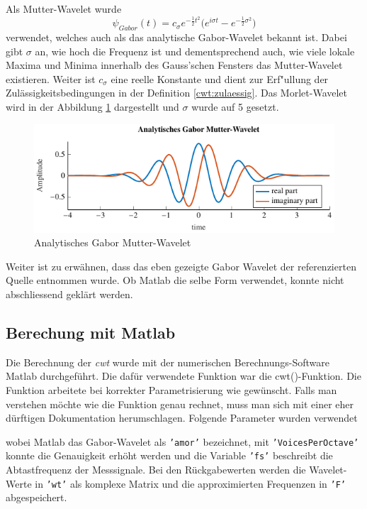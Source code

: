\begin{refsection}
Als Mutter-Wavelet wurde 
\begin{equation}
\psi_{Gabor}(t) =  c_{\sigma} e^{-\frac{1}{2}t^2} \biggl(e^{i \sigma t}- e^{-\frac{1}{2} \sigma^2} \biggr)
\label{eq:morlet}
\end{equation} \cite{online:Morlet}
verwendet, welches auch als das analytische Gabor-Wavelet bekannt ist.
Dabei gibt $\sigma$ an, wie hoch die Frequenz ist und dementsprechend auch, wie viele lokale Maxima und Minima innerhalb des Gauss'schen Fensters das Mutter-Wavelet existieren.
Weiter ist $c_{\sigma}$ eine reelle Konstante und dient zur Erf"ullung der Zulässigkeitsbedingungen in der Definition \ref{cwt:zulaessig}.
Das Morlet-Wavelet wird in der Abbildung \ref{fig:gabor_plot} \space dargestellt und $\sigma$ wurde auf 5 gesetzt.

\begin{figure}
\centering
\includegraphics[width=1\textwidth]{papers/wwt/images/gabor.pdf}
\caption{Analytisches Gabor Mutter-Wavelet}
\label{fig:gabor_plot}
\end{figure}

Weiter ist zu erwähnen, dass das eben gezeigte Gabor Wavelet der referenzierten Quelle entnommen wurde. Ob Matlab die selbe Form verwendet, konnte nicht abschliessend geklärt werden.

\subsection{Berechung mit Matlab}
Die Berechnung der \textit{cwt} wurde mit der numerischen Berechnungs-Software Matlab durchgeführt.
Die dafür verwendete Funktion war die cwt()-Funktion.
Die Funktion arbeitete bei korrekter Parametrisierung wie gewünscht.
Falls man verstehen möchte wie die Funktion genau rechnet, muss man sich mit einer eher dürftigen Dokumentation herumschlagen.
Folgende Parameter wurden verwendet

\label{fig:matlab_code_cwt}
wobei Matlab das Gabor-Wavelet als \texttt{'amor'} bezeichnet, mit \texttt{'VoicesPerOctave'} konnte die Genauigkeit erhöht werden und die Variable \texttt{'fs'} beschreibt die Abtastfrequenz der Messsignale.
Bei den Rückgabewerten werden die Wavelet-Werte in \texttt{'wt'} als komplexe Matrix und die approximierten Frequenzen in \texttt{'F'} abgespeichert.


\end{refsection}
